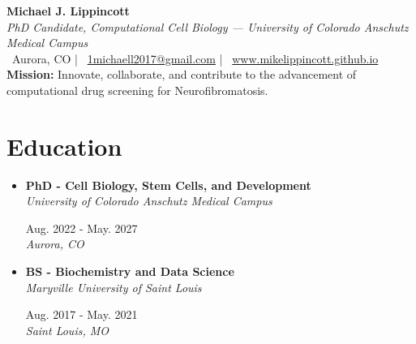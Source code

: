 \documentclass[10.5pt,letterpaper]{article}
\newcommand{\subheadingskip}{3pt}
\newcommand{\rightcolwidth}{1.3in}
\newcommand{\resumeSubheading}[4]{%
  \vspace{\subheadingskip}\item[]
  \begingroup\rightskip0pt\parfillskip0pt
  \noindent\begin{minipage}[t]{\dimexpr\textwidth-\rightcolwidth-6pt\relax}
    \raggedright\textbf{#1}\\
    \textit{\small\color{muted}#3}
  \end{minipage}%
  \hfill
  \begin{minipage}[t]{\rightcolwidth}
    \raggedleft\textcolor{accent}{\small #2}\\
    \textit{\small\color{muted}#4}
  \end{minipage}
  \par\endgroup
}
\newcommand{\resumeSubHeadingListStart}{\begin{itemize}[leftmargin=0pt,label={},itemsep=2pt,topsep=2pt,parsep=0pt]}
\newcommand{\resumeSubHeadingListEnd}{\end{itemize}}
\begin{document}
\begin{center}
  {\sffamily\bfseries\Huge\color{accent} Michael J. Lippincott}\\[3pt]
  {\normalfont\itshape\color{muted} PhD Candidate, Computational Cell Biology --- University of Colorado Anschutz Medical Campus}\\[6pt]
  {\small
    \ Aurora, CO
    \quad\textcolor{muted}{|}\quad
    \ \href{mailto:1michaell2017@gmail.com}{1michaell2017@gmail.com}
    \quad\textcolor{muted}{|}\quad
    \ \href{http://www.mikelippincott.github.io}{www.mikelippincott.github.io}
  }\\[3pt]
  {\normalfont\small\color{muted} \textbf{Mission:} Innovate, collaborate, and contribute to the advancement of computational drug screening for Neurofibromatosis.}\\[3pt]
\end{center}
\vspace{-4pt}

\section{Education}
  \resumeSubHeadingListStart
    \resumeSubheading
      {PhD - Cell Biology, Stem Cells, and Development}{Aug. 2022 - May. 2027}
      {University of Colorado Anschutz Medical Campus}{Aurora, CO}
    \resumeSubheading
      {BS - Biochemistry and Data Science}{Aug. 2017 - May. 2021}
      {Maryville University of Saint Louis}{Saint Louis, MO}
  \resumeSubHeadingListEnd

\end{document}
